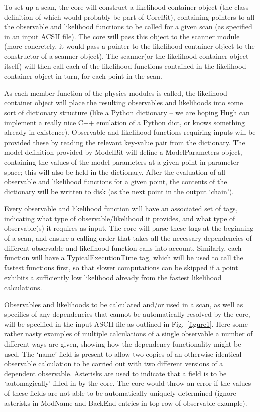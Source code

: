 To set up a scan, the core will construct a likelihood container object (the class definition of which would probably be part of CoreBit), containing pointers to all the observable and likelihood functions to be called for a given scan (as specified in an input ACSII file).  The core will pass this object to the scanner module (more concretely, it would pass a pointer to the likelihood container object to the constructor of a scanner object).  The scanner(or the likelihood container object itself) will then call each of the likelihood functions contained in the likelihood container object in turn, for each point in the scan.

As each member function of the physics modules is called, the likelihood container object will place the resulting observables and likelihoods into some sort of dictionary structure (like a Python dictionary -- we are hoping Hugh can implement a really nice C++ emulation of a Python dict, or knows something already in existence).  Observable and likelihood functions requiring inputs will be provided these by reading the relevant key-value pair from the dictionary.  The model definition provided by ModelBit will define a ModelParameters object, containing the values of the model parameters at a given point in parameter space; this will also be held in the dictionary.  After the evaluation of all observable and likelihood functions for a given point, the contents of the dictionary will be written to disk (as the next point in the output `chain').

Every observable and likelihood function will have an associated set of tags, indicating what type of observable/likelihood it provides, and what type of observable(s) it requires as input.  The core will parse these tags at the beginning of a scan, and ensure a calling order that takes all the necessary dependencies of different observable and likelihood function calls into account.  Similarly, each function will have a TypicalExecutionTime tag, which will be used to call the fastest functions first, so that slower computations can be skipped if a point exhibits a sufficiently low likelihood already from the fastest likelihood calculations.

Observables and likelihoods to be calculated and/or used in a scan, as well as specifics of any dependencies that cannot be automatically resolved by the core, will be specified in the input ASCII file as outlined in Fig.~\ref{figure1}.  Here some rather nasty examples of multiple calculations of a single observable a number of different ways are given, showing how the dependency functionality might be used.  The `name' field is present to allow two copies of an otherwise identical observable calculation to be carried out with two different versions of a dependent observable.  Asterisks are used to indicate that a field is to be `automagically' filled in by the core.  The core would throw an error if the values of these fields are not able to be automatically uniquely determined (ignore asterisks in ModName and BackEnd entries in top row of observable example).

